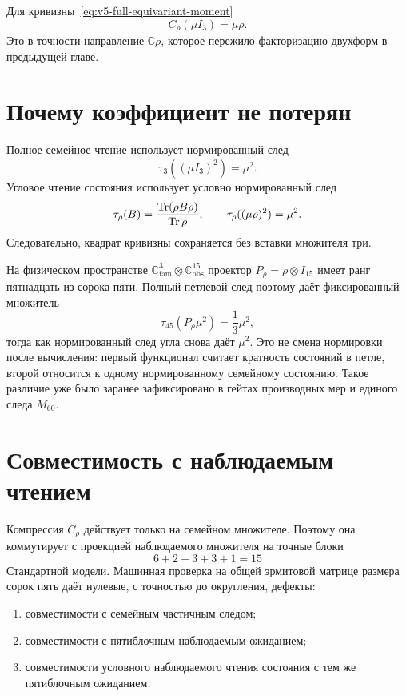 Для кривизны~\eqref{eq:v5-full-equivariant-moment}
\begin{equation}
 C_\rho(\mu I_3)=\mu\rho.
 \label{eq:v5-corner-moment-readout}
\end{equation}
Это в точности направление \(\mathbb C\rho\), которое пережило
факторизацию двухформ в предыдущей главе.

\section{Почему коэффициент не потерян}

Полное семейное чтение использует нормированный след
\begin{equation}
 \tau_3((\mu I_3)^2)=\mu^2.
\end{equation}
Угловое чтение состояния использует условно нормированный след
\begin{equation}
 \tau_\rho(B)=\frac{\operatorname{Tr}(\rho B\rho)}{\operatorname{Tr}\rho},
 \qquad
 \tau_\rho((\mu\rho)^2)=\mu^2.
 \label{eq:v5-corner-normalized-norm}
\end{equation}
Следовательно, квадрат кривизны сохраняется без вставки множителя три.

На физическом пространстве
\(\mathbb C^3_{\mathrm{fam}}\otimes\mathbb C^{15}_{\mathrm{obs}}\)
проектор \(P_\rho=\rho\otimes I_{15}\) имеет ранг пятнадцать из сорока
пяти. Полный петлевой след поэтому даёт фиксированный множитель
\begin{equation}
 \tau_{45}(P_\rho\mu^2)=\frac13\mu^2,
\end{equation}
тогда как нормированный след угла снова даёт \(\mu^2\). Это не смена
нормировки после вычисления: первый функционал считает кратность состояний
в петле, второй относится к одному нормированному семейному состоянию.
Такое различие уже было заранее зафиксировано в гейтах производных мер и
единого следа \(M_{60}\).

\section{Совместимость с наблюдаемым чтением}

Компрессия \(C_\rho\) действует только на семейном множителе. Поэтому она
коммутирует с проекцией наблюдаемого множителя на точные блоки
\begin{equation}
 6+2+3+3+1=15
\end{equation}
Стандартной модели. Машинная проверка на общей эрмитовой матрице размера
сорок пять даёт нулевые, с точностью до округления, дефекты:
\begin{enumerate}
 \item совместимости с семейным частичным следом;
 \item совместимости с пятиблочным наблюдаемым ожиданием;
 \item совместимости условного наблюдаемого чтения состояния с тем же
 пятиблочным ожиданием.
\end{enumerate}

